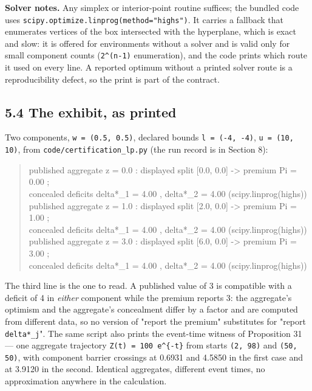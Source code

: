\documentclass[11pt]{article}
\begin{document}
\textbf{Solver notes.} Any simplex or interior-point routine suffices; the bundled code uses \texttt{scipy.optimize.linprog(method="highs")}. It carries a fallback that enumerates vertices of the box intersected with the hyperplane, which is exact and slow: it is offered for environments without a solver and is valid only for small component counts (\texttt{2\textasciicircum{}(n-1)} enumeration), and the code prints which route it used on every line. A reported optimum without a printed solver route is a reproducibility defect, so the print is part of the contract.

\subsection*{5.4 The exhibit, as printed}\label{54-the-exhibit-as-printed}

Two components, \texttt{w = (0.5, 0.5)}, declared bounds \texttt{l = (-4, -4)}, \texttt{u = (10, 10)}, from \texttt{code/certification\_lp.py} (the run record is in Section 8):

\begin{quote}\ttfamily\footnotesize\raggedright\setlength{\parskip}{0pt}
published aggregate z =  0.0 :  displayed split [0.0, 0.0] -> premium Pi =  0.00 ;\\
                                 concealed deficits delta*\_1 = 4.00 , delta*\_2 = 4.00   (scipy.linprog(highs))\\
published aggregate z =  1.0 :  displayed split [2.0, 0.0] -> premium Pi =  1.00 ;\\
                                 concealed deficits delta*\_1 = 4.00 , delta*\_2 = 4.00   (scipy.linprog(highs))\\
published aggregate z =  3.0 :  displayed split [6.0, 0.0] -> premium Pi =  3.00 ;\\
                                 concealed deficits delta*\_1 = 4.00 , delta*\_2 = 4.00   (scipy.linprog(highs))
\end{quote}

The third line is the one to read. A published value of 3 is compatible with a deficit of 4 in \emph{either} component while the premium reports 3: the aggregate's optimism and the aggregate's concealment differ by a factor and are computed from different data, so no version of "report the premium" substitutes for "report \texttt{delta*\_j}". The same script also prints the event-time witness of Proposition 31 --- one aggregate trajectory \texttt{Z(t) = 100 e\textasciicircum{}\{-t\}} from starts \texttt{(2, 98)} and \texttt{(50, 50)}, with component barrier crossings at 0.6931 and 4.5850 in the first case and at 3.9120 in the second. Identical aggregates, different event times, no approximation anywhere in the calculation.
\end{document}
